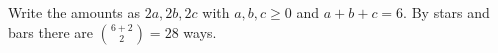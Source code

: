 Write the amounts as $2a,2b,2c$ with $a,b,c\ge0$ and $a+b+c=6$. By stars and bars there are $\binom{6+2}{2}=\boxed{28}$ ways.
